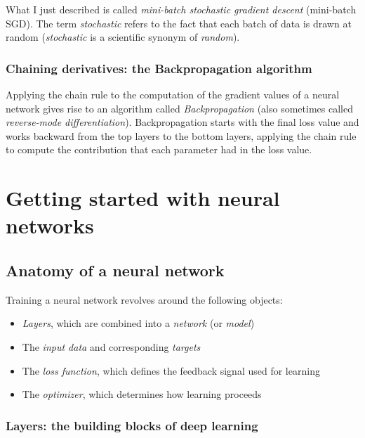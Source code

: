\documentclass{article}
\numberwithin{equation}{section} %
\begin{document}
What I just described is called \textit{mini-batch stochastic gradient descent} (mini-batch SGD). The term \textit{stochastic} refers to the fact that each batch of data is drawn at random (\textit{stochastic} is a scientific synonym of \textit{random}). \\


\subsubsection{Chaining derivatives: the Backpropagation algorithm}

Applying the chain rule to the computation of the gradient values of a neural network gives rise to an algorithm called \textit{Backpropagation} (also sometimes called \textit{reverse-mode differentiation}). Backpropagation starts with the final loss value and works backward from the top layers to the bottom layers, applying the chain rule to compute the contribution that each parameter had in the loss value.



\newpage

\section{Getting started with neural networks}

\subsection{Anatomy of a neural network}

Training a neural network revolves around the following objects:

\begin{itemize}
	\item \textit{Layers}, which are combined into a \textit{network} (or \textit{model})
	\item The \textit{input data} and corresponding \textit{targets}
	\item The \textit{loss function}, which defines the feedback signal used for learning
	\item The \textit{optimizer}, which determines how learning proceeds
\end{itemize}


\subsubsection{Layers: the building blocks of deep learning}
\end{document}
